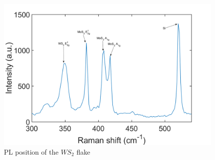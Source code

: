 \begin{figure}[h]
	\begin{center}
		\includegraphics[scale=0.3]{Heterostructures/RamanSpectrum.png}
		\caption{PL position of the $WS_2$ flake}
		\label{fig:HeterostructuresPLPosition22Map}
	\end{center}
\end{figure}